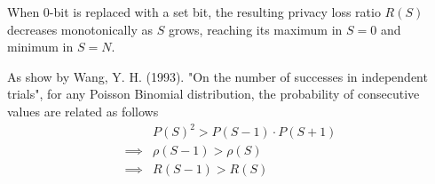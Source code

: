 \documentclass[11pt]{article}
\begin{document}
 \begin{lem} \label{lem:rs1}
When 0-bit is replaced with a set bit, the resulting privacy loss ratio $R(S)$ decreases monotonically as $S$ grows, reaching its maximum in $S=0$ and minimum in $S=N$.
\end{lem}
\begin{pf}
 As show by Wang, Y. H. (1993). "On the number of successes in independent trials", for any Poisson Binomial distribution, the probability of consecutive values are related as follows
 \begin{align*}
 & P(S)^2  > P(S-1) \cdot P(S+1) \\
\implies &  \rho(S-1) > \rho(S) \\
\implies & R(S-1) > R(S)
\end{align*}
\end{pf}
\end{document}
